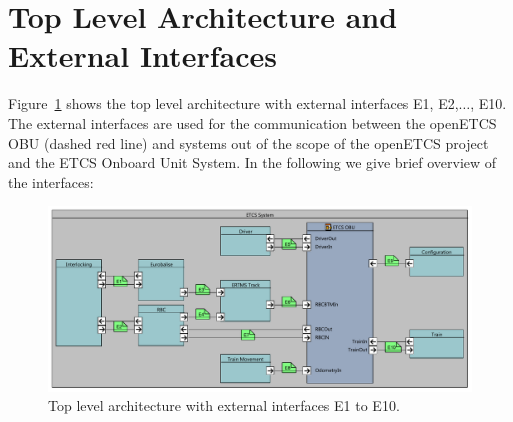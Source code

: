 \documentclass{template/openetcs_report}
\begin{document}
\section{Top Level Architecture and External Interfaces}

Figure~\ref{f:top_level} shows the top level architecture with external interfaces E1, E2,$\ldots$, E10. The external interfaces are used for the communication between the openETCS OBU (dashed red line) and systems out of the scope of the openETCS project and the ETCS Onboard Unit System. In the following we give  brief overview of the interfaces:
\begin{figure}
\centering
\includegraphics[width=\textwidth]{ETCS_system.pdf}
\caption{Top level architecture with external interfaces E1 to E10.}
\label{f:top_level}
\end{figure}
\end{document}
